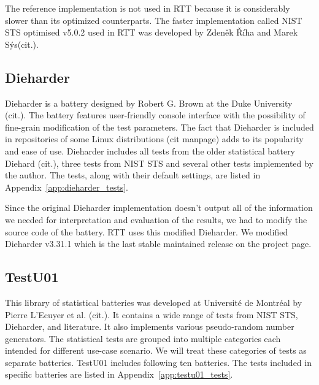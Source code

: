 \documentclass[
  digital,  	%
  color,		%
  oneside,   	%
  12pt,
  nocover,
  notable,
  nolof,
  nolot,
]{fithesis3}
\begin{document}
The reference implementation is not used in RTT because it is considerably slower than its optimized counterparts. The faster implementation called NIST STS optimised v5.0.2 used in RTT was developed by Zdeněk Říha and Marek Sýs(cit.).

\subsection{Dieharder}
Dieharder is a battery designed by Robert G. Brown at the Duke University (cit.). The battery features user-friendly console interface with the possibility of fine-grain modification of the test parameters. The fact that Dieharder is included in repositories of some Linux distributions (cit manpage) adds to its popularity and ease of use. Dieharder includes all tests from the older statistical battery Diehard (cit.), three tests from NIST STS and several other tests implemented by the author. The tests, along with their default settings, are listed in Appendix~\ref{app:dieharder_tests}.

Since the original Dieharder implementation doesn't output all of the information we needed for interpretation and evaluation of the results, we had to modify the source code of the battery. RTT uses this modified Dieharder. We modified Dieharder v3.31.1 which is the last stable maintained release on the project page.

\subsection{TestU01}
This library of statistical batteries was developed at Université de Montréal by Pierre L’Ecuyer et al. (cit.). It contains a wide range of tests from NIST STS, Dieharder, and literature. It also implements various pseudo-random number generators. The statistical tests are grouped into multiple categories each intended for different use-case scenario. We will treat these categories of tests as separate batteries. TestU01 includes following ten batteries. The tests included in specific batteries are listed in Appendix~\ref{app:testu01_tests}.
\end{document}
